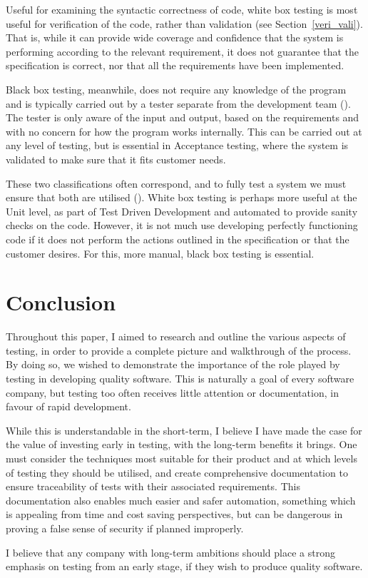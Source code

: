 \documentclass[12pt]{article}
\begin{document}
Useful for examining the syntactic correctness of code, white box testing is most useful for verification of the code, rather than validation (see Section~\ref{veri_vali}). That is, while it can provide wide coverage and confidence that the system is performing according to the relevant requirement, it does not guarantee that the specification is correct, nor that all the requirements have been implemented.

Black box testing, meanwhile, does not require any knowledge of the program and is typically carried out by a tester separate from the development team (). The tester is only aware of the input and output, based on the requirements and with no concern for how the program works internally. This can be carried out at any level of testing, but is essential in Acceptance testing, where the system is validated to make sure that it fits customer needs. 

These two classifications often correspond, and to fully test a system we must ensure that both are utilised (). White box testing is perhaps more useful at the Unit level, as part of Test Driven Development and automated to provide sanity checks on the code. However, it is not much use developing perfectly functioning code if it does not perform the actions outlined in the specification or that the customer desires. For this, more manual, black box testing is essential.



\section{Conclusion}

Throughout this paper, I aimed to research and outline the various aspects of testing, in order to provide a complete picture and walkthrough of the process. By doing so, we wished to demonstrate the importance of the role played by testing in developing quality software. This is naturally a goal of every software company, but testing too often receives little attention or documentation, in favour of rapid development.

While this is understandable in the short-term, I believe I have made the case for the value of investing early in testing, with the long-term benefits it brings. One must consider the techniques most suitable for their product and at which levels of testing they should be utilised, and create comprehensive documentation to ensure traceability of tests with their associated requirements. This documentation also enables much easier and safer automation, something which is appealing from time and cost saving perspectives, but can be dangerous in proving a false sense of security if planned improperly.

I believe that any company with long-term ambitions should place a strong emphasis on testing from an early stage, if they wish to produce quality software.




\renewcommand{\bibname}{References} %
\end{document}
